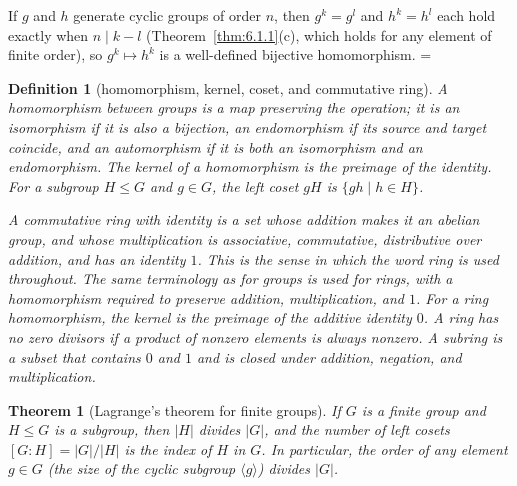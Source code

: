 \documentclass[11pt]{article}
\makeatletter
\theoremstyle{ntstyle}
\newtheorem{theorem}{Theorem}[subsection]
\newtheorem{definition}{Definition}[subsection]
\let\nt@closedisplay\]
\def\nt@guardedclose{\@ifnextchar\par{\nt@closeafterpar}{\@ifnextchar\end{\postdisplaypenalty\@M\nt@closedisplay}{\nt@closedisplay}}}
\def\nt@closeafterpar\par{\@ifnextchar\par{\nt@closeafterpar}{\@ifnextchar\end{\postdisplaypenalty\@M\nt@closedisplay\par}{\nt@closedisplay\par}}}
\renewenvironment{proof}[1][\proofname]{\par
  \pushQED{\qed}\normalfont\topsep\medskipamount\edef\nt@afterproof{\@endparpenalty=\the\@endparpenalty\relax}\@beginparpenalty\@M\@endparpenalty\@M\let\]\nt@guardedclose\trivlist\item[]\textit{#1\@addpunct{.}} \ignorespaces}{\ifvmode\addpenalty\@M\fi\popQED\nt@afterproof\endtrivlist\@endpefalse}
\makeatother
\begin{document}
\begin{proof} If $g$ and $h$ generate cyclic
	groups of order $n$, then $g^k=g^l$ and $h^k=h^l$ each hold exactly when
	$n\mid k-l$ (Theorem~\ref{thm:6.1.1}(c), which holds for any element of finite
	order), so $g^k\mapsto h^k$ is a well-defined bijective homomorphism.
\end{proof}
\begin{definition}[homomorphism, kernel, coset, and commutative ring]\label{def:6.6.4}
	A homomorphism between groups is a map preserving the operation; it is
	an isomorphism if it is also a bijection, an endomorphism if its source and
	target coincide, and an automorphism if it is both an isomorphism and an endomorphism. The kernel of a
	homomorphism is the preimage of the identity. For a subgroup $H\le G$
	and $g\in G$, the left coset $gH$ is $\{gh\mid h\in H\}$.

	A commutative ring with identity is a set whose addition makes it an
	abelian group, and whose multiplication is associative, commutative,
	distributive over addition, and has an identity $1$.
	This is the sense in which the word ring is used throughout.
	The same terminology as for groups is used for rings, with a
	homomorphism required
	to preserve addition, multiplication, and $1$. For a ring homomorphism, the kernel is the preimage
	of the additive identity $0$. A ring has no zero divisors if a product
	of nonzero elements is always nonzero. A subring is a subset that
	contains $0$ and $1$ and is closed under addition, negation, and
	multiplication.
\end{definition}

\begin{theorem}[Lagrange's theorem for finite groups]\label{thm:6.6.2} If $G$ is a
	finite group and $H \le G$ is a subgroup, then $|H|$ divides $|G|$, and
	the number of left cosets $[G:H] = |G|/|H|$ is the index of $H$ in
	$G$. In particular, the order of any element $g \in G$ (the size of
	the cyclic subgroup $\langle g\rangle$) divides $|G|$.
\end{theorem}
\end{document}
